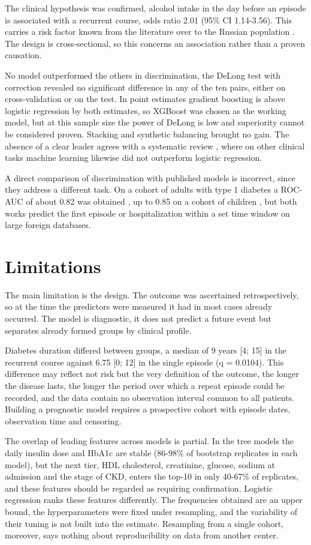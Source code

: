 \documentclass[pdflatex,sn-basic,Numbered]{sn-jnl}
\begin{document}
The clinical hypothesis was confirmed, alcohol intake in the day before an episode is associated with a recurrent course, odds ratio 2.01 (95\% CI 1.14-3.56). This carries a risk factor known from the literature over to the Russian population \cite{ref7,ref9,ref16}. The design is cross-sectional, so this concerns an association rather than a proven causation.

No model outperformed the others in discrimination, the DeLong test with correction revealed no significant difference in any of the ten pairs, either on cross-validation or on the test. In point estimates gradient boosting is above logistic regression by both estimates, so XGBoost was chosen as the working model, but at this sample size the power of DeLong is low and superiority cannot be considered proven. Stacking and synthetic balancing brought no gain. The absence of a clear leader agrees with a systematic review \cite{ref17}, where on other clinical tasks machine learning likewise did not outperform logistic regression.

A direct comparison of discrimination with published models is incorrect, since they address a different task. On a cohort of adults with type 1 diabetes a ROC-AUC of about 0.82 was obtained \cite{ref11}, up to 0.85 on a cohort of children \cite{ref10}, but both works predict the first episode or hospitalization within a set time window on large foreign databases.

\section{Limitations}\label{sec5}

The main limitation is the design. The outcome was ascertained retrospectively, so at the time the predictors were measured it had in most cases already occurred. The model is diagnostic, it does not predict a future event but separates already formed groups by clinical profile.

Diabetes duration differed between groups, a median of 9 years [4; 15] in the recurrent course against 6.75 [0; 12] in the single episode (q = 0.0104). This difference may reflect not risk but the very definition of the outcome, the longer the disease lasts, the longer the period over which a repeat episode could be recorded, and the data contain no observation interval common to all patients. Building a prognostic model requires a prospective cohort with episode dates, observation time and censoring.

The overlap of leading features across models is partial. In the tree models the daily insulin dose and HbA1c are stable (86-98\% of bootstrap replicates in each model), but the next tier, HDL cholesterol, creatinine, glucose, sodium at admission and the stage of CKD, enters the top-10 in only 40-67\% of replicates, and these features should be regarded as requiring confirmation. Logistic regression ranks these features differently. The frequencies obtained are an upper bound, the hyperparameters were fixed under resampling, and the variability of their tuning is not built into the estimate. Resampling from a single cohort, moreover, says nothing about reproducibility on data from another center.
\end{document}
